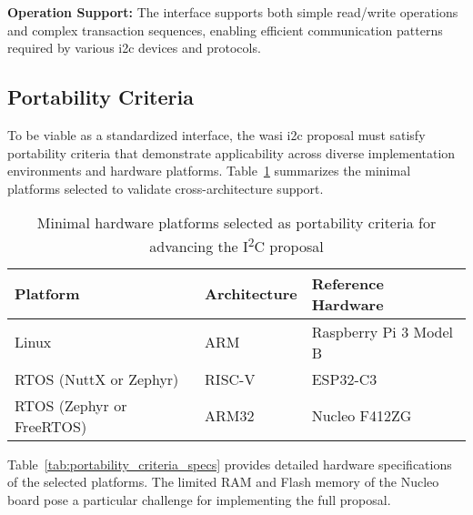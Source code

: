 \textbf{Operation Support:} The interface supports both simple read/write operations and complex transaction sequences, enabling efficient communication patterns required by various \acrshort{i2c} devices and protocols.

\subsection{Portability Criteria}
\label{subsec:i2c-portability}

To be viable as a standardized interface, the \acrshort{wasi} \acrshort{i2c} proposal must satisfy portability criteria that demonstrate applicability across diverse implementation environments and hardware platforms. Table~\ref{tab:portability_criteria} summarizes the minimal platforms selected to validate cross-architecture support.

\begin{table}[H]
    \centering
    \captionsetup{justification=centering}
    \caption{Minimal hardware platforms selected as portability criteria for advancing the I\textsuperscript{2}C proposal}
    \label{tab:portability_criteria}
    \begin{tabular}{lll}
        \toprule
        \textbf{Platform} & \textbf{Architecture} & \textbf{Reference Hardware} \\
        \midrule
        Linux & ARM & Raspberry Pi 3 Model B \\
        RTOS (NuttX or Zephyr) & RISC-V & ESP32-C3 \\
        RTOS (Zephyr or FreeRTOS) & ARM32 & Nucleo F412ZG \\
        \bottomrule
    \end{tabular}
\end{table}

Table~\ref{tab:portability_criteria_specs} provides detailed hardware specifications of the selected platforms. The limited RAM and Flash memory of the Nucleo board pose a particular challenge for implementing the full proposal.

